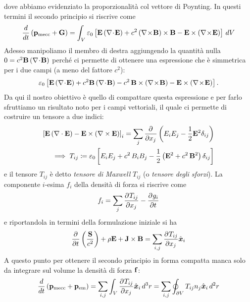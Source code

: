 dove abbiamo evidenziato la proporzionalità col vettore di Poynting. In questi termini il secondo principio si riscrive come
\begin{align}
  \frac{d}{dt} \left( \mathbf{p}_{\text{mecc}} + \mathbf{G} \right) 
  = \int_V \varepsilon_0 \left[ \mathbf{ E } \left( \nabla\!\cdot\!\mathbf{ E } \right) + c^2 \left( \nabla\!\times\!\mathbf{ B } \right) \times \mathbf{ B } 
  - \mathbf{ E } \times \left( \nabla\!\times\!\mathbf{ E } \right) \right] \,dV
\end{align}
Adesso manipoliamo il membro di destra aggiungendo la quantità nulla $ 0 = c^2 \mathbf{ B } \left( \nabla\!\cdot\!\mathbf{ B } \right) $ perché ci permette di 
ottenere una espressione che è simmetrica per i due campi (a meno del fattore $ c^2 $):
\begin{align}
  \eps_0 \left[ \v{ E } \left( \nabla\!\cdot\!\v{ E } \right) + c^2 \v{ B } \left( \nabla\!\cdot\!\v{ B } \right) 
  -  c^2 \, \v{ B } \times \left( \nabla\!\times\!\v{ B } \right)  
  - \v{ E } \times \left( \nabla\!\times\!\v{ E } \right) \right].
\end{align}
Da qui il nostro obiettivo è quello di compattare questa espressione e per farlo sfruttiamo un risultato noto per i campi vettoriali, il quale ci permette 
di costruire un tensore a due indici:
\begin{align}
  \left[ \mathbf{ E } \left( \nabla \cdot \mathbf{ E } \right) - \mathbf{ E } \times \left( \nabla \times \mathbf{ E } \right) \right]_i 
  = \sum_{j} \frac{\partial^{} {}}{\partial {x_j}^{}} \left( E_i E_j - \frac{1}{2} \mathbf{ E }^2 \delta_{i j} \right)
  \\
  \implies T_{i j} \coloneqq \varepsilon_0 \left[ E_i E_j + c^2 \, B_i B_j - \frac{1}{2} \left( \mathbf{ E }^2 + c^2 \, \mathbf{ B }^2 \right) \delta_{i j} \right]
\end{align}
e il tensore $ T_{i j} $ è detto \textit{tensore di Maxwell} $ T_{i j} $ (o \textit{tensore degli sforzi}). La componente $ i $-esima $ f_i $ della densità 
di forza si riscrive come
\begin{align}
  f_i = \sum_j \frac{\partial^{} {T_{i j}}}{\partial {x_j}^{}} - \frac{\partial^{} {g_i}}{\partial {t}^{}}
\end{align}
e riportandola in termini della formulazione iniziale si ha
\begin{align}
  \frac{\partial^{} {}}{\partial {t}^{}} \left( \frac{\mathbf{S}}{c^2} \right) + \rho \mathbf{ E } + \mathbf{ J } \times \mathbf{ B } = \sum_{i,j} \frac{\partial^{} {T_{i j}}}{\partial {x_j}^{}} \hat{\boldsymbol{x}}_i
\end{align}
A questo punto per ottenere il secondo principio in forma compatta manca solo da integrare sul volume la densità di forza $ \mathbf{f} $:
\begin{align}
  \frac{d}{dt} \left( \mathbf{ p }_{\text{mecc}} + \mathbf{ p }_{\text{em}} \right) 
  = \sum_{i,j} \int_V \frac{\partial^{} {T_{i j}}}{\partial {x_j}^{}} \hat{\boldsymbol{x}}_i \,d^3r = \sum_{i,j} \oint_{\partial V} T_{i j} n_j \hat{\boldsymbol{x}}_i \,d^2r
\end{align}
